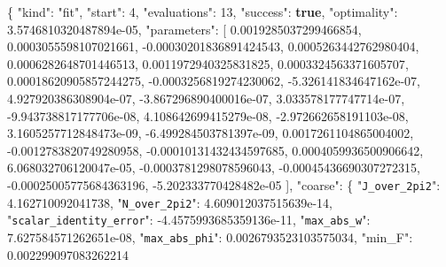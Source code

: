\documentclass[
  10pt,
]{article}
\newenvironment{Shaded}{}{}
\newcommand{\DataTypeTok}[1]{\textcolor[rgb]{0.56,0.13,0.00}{#1}}
\newcommand{\DecValTok}[1]{\textcolor[rgb]{0.25,0.63,0.44}{#1}}
\newcommand{\FloatTok}[1]{\textcolor[rgb]{0.25,0.63,0.44}{#1}}
\newcommand{\FunctionTok}[1]{\textcolor[rgb]{0.02,0.16,0.49}{#1}}
\newcommand{\KeywordTok}[1]{\textcolor[rgb]{0.00,0.44,0.13}{\textbf{#1}}}
\newcommand{\OtherTok}[1]{\textcolor[rgb]{0.00,0.44,0.13}{#1}}
\newcommand{\StringTok}[1]{\textcolor[rgb]{0.25,0.44,0.63}{#1}}
\begin{document}
\begin{Shaded}
\begin{Highlighting}[]
\FunctionTok{\{}
  \DataTypeTok{"kind"}\FunctionTok{:} \StringTok{"fit"}\FunctionTok{,}
  \DataTypeTok{"start"}\FunctionTok{:} \DecValTok{4}\FunctionTok{,}
  \DataTypeTok{"evaluations"}\FunctionTok{:} \DecValTok{13}\FunctionTok{,}
  \DataTypeTok{"success"}\FunctionTok{:} \KeywordTok{true}\FunctionTok{,}
  \DataTypeTok{"optimality"}\FunctionTok{:} \FloatTok{3.5746810320487894e{-}05}\FunctionTok{,}
  \DataTypeTok{"parameters"}\FunctionTok{:} \OtherTok{[}
    \FloatTok{0.0019285037299466854}\OtherTok{,}
    \FloatTok{0.0003055598107021661}\OtherTok{,}
    \FloatTok{{-}0.00030201836891424543}\OtherTok{,}
    \FloatTok{0.0005263442762980404}\OtherTok{,}
    \FloatTok{0.0006282648701446513}\OtherTok{,}
    \FloatTok{0.0011972940325831825}\OtherTok{,}
    \FloatTok{0.0003324563371605707}\OtherTok{,}
    \FloatTok{0.00018620905857244275}\OtherTok{,}
    \FloatTok{{-}0.0003256819274230062}\OtherTok{,}
    \FloatTok{{-}5.326141834647162e{-}07}\OtherTok{,}
    \FloatTok{4.927920386308904e{-}07}\OtherTok{,}
    \FloatTok{{-}3.867296890400016e{-}07}\OtherTok{,}
    \FloatTok{3.033578177747714e{-}07}\OtherTok{,}
    \FloatTok{{-}9.943738817177706e{-}08}\OtherTok{,}
    \FloatTok{4.108642699415279e{-}08}\OtherTok{,}
    \FloatTok{{-}2.972662658191103e{-}08}\OtherTok{,}
    \FloatTok{3.1605257712848473e{-}09}\OtherTok{,}
    \FloatTok{{-}6.499284503781397e{-}09}\OtherTok{,}
    \FloatTok{0.0017261104865004002}\OtherTok{,}
    \FloatTok{{-}0.0012783820749280958}\OtherTok{,}
    \FloatTok{{-}0.00010131432434597685}\OtherTok{,}
    \FloatTok{0.0004059936500906642}\OtherTok{,}
    \FloatTok{6.068032706120047e{-}05}\OtherTok{,}
    \FloatTok{{-}0.0003781298078596043}\OtherTok{,}
    \FloatTok{{-}0.00045436690307272315}\OtherTok{,}
    \FloatTok{{-}0.00025005775684363196}\OtherTok{,}
    \FloatTok{{-}5.202333770428482e{-}05}
  \OtherTok{]}\FunctionTok{,}
  \DataTypeTok{"coarse"}\FunctionTok{:} \FunctionTok{\{}
    \DataTypeTok{"\nolinkurl{J_over_2pi2}"}\FunctionTok{:} \FloatTok{4.162710092041738}\FunctionTok{,}
    \DataTypeTok{"\nolinkurl{N_over_2pi2}"}\FunctionTok{:} \FloatTok{4.609012037515639e{-}14}\FunctionTok{,}
    \DataTypeTok{"\nolinkurl{scalar_identity_error}"}\FunctionTok{:} \FloatTok{{-}4.4575993685359136e{-}11}\FunctionTok{,}
    \DataTypeTok{"\nolinkurl{max_abs_w}"}\FunctionTok{:} \FloatTok{7.627584571262651e{-}08}\FunctionTok{,}
    \DataTypeTok{"\nolinkurl{max_abs_phi}"}\FunctionTok{:} \FloatTok{0.0026793523103575034}\FunctionTok{,}
    \DataTypeTok{"min\_F"}\FunctionTok{:} \FloatTok{0.002299097083262214}

\end{Highlighting}
\end{Shaded}
\end{document}
